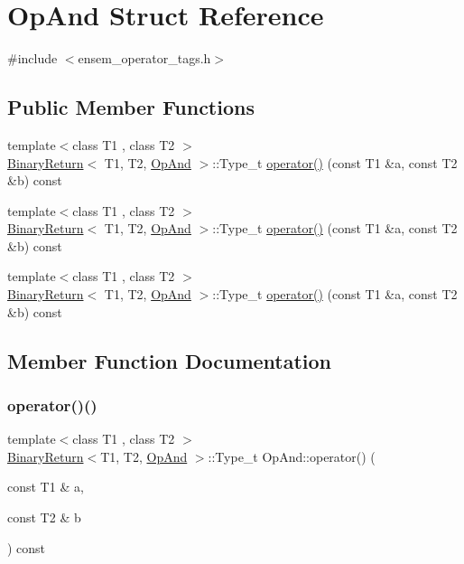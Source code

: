 \hypertarget{structOpAnd}{}\section{Op\+And Struct Reference}
\label{structOpAnd}


{\ttfamily \#include $<$ensem\+\_\+operator\+\_\+tags.\+h$>$}

\subsection*{Public Member Functions}
\begin{DoxyCompactItemize}
\item 
{\footnotesize template$<$class T1 , class T2 $>$ }\\\mbox{\hyperlink{structBinaryReturn}{Binary\+Return}}$<$ T1, T2, \mbox{\hyperlink{structOpAnd}{Op\+And}} $>$\+::Type\+\_\+t \mbox{\hyperlink{structOpAnd_a27c9f5545b8961284cc388628ac2f9bb}{operator()}} (const T1 \&a, const T2 \&b) const
\item 
{\footnotesize template$<$class T1 , class T2 $>$ }\\\mbox{\hyperlink{structBinaryReturn}{Binary\+Return}}$<$ T1, T2, \mbox{\hyperlink{structOpAnd}{Op\+And}} $>$\+::Type\+\_\+t \mbox{\hyperlink{structOpAnd_a27c9f5545b8961284cc388628ac2f9bb}{operator()}} (const T1 \&a, const T2 \&b) const
\item 
{\footnotesize template$<$class T1 , class T2 $>$ }\\\mbox{\hyperlink{structBinaryReturn}{Binary\+Return}}$<$ T1, T2, \mbox{\hyperlink{structOpAnd}{Op\+And}} $>$\+::Type\+\_\+t \mbox{\hyperlink{structOpAnd_a27c9f5545b8961284cc388628ac2f9bb}{operator()}} (const T1 \&a, const T2 \&b) const
\end{DoxyCompactItemize}


\subsection{Member Function Documentation}
\mbox{\label{structOpAnd_a27c9f5545b8961284cc388628ac2f9bb}} 
\subsubsection{\texorpdfstring{operator()()}{operator()()}\hspace{0.1cm}{\footnotesize\ttfamily [1/3]}}
{\footnotesize\ttfamily template$<$class T1 , class T2 $>$ \\
\mbox{\hyperlink{structBinaryReturn}{Binary\+Return}}$<$T1, T2, \mbox{\hyperlink{structOpAnd}{Op\+And}} $>$\+::Type\+\_\+t Op\+And\+::operator() (\begin{DoxyParamCaption}\item[{const T1 \&}]{a,  }\item[{const T2 \&}]{b }\end{DoxyParamCaption}) const\hspace{0.3cm}{\ttfamily [inline]}}

